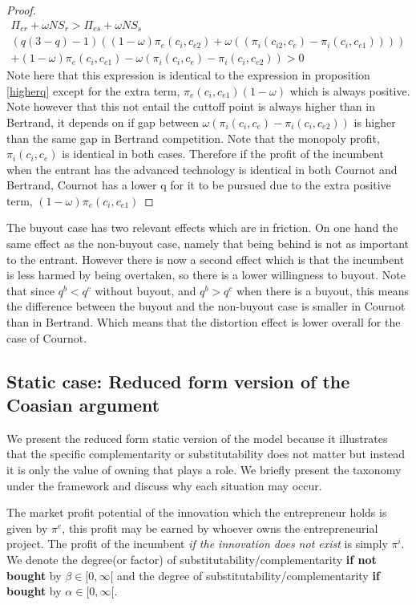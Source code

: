 \begin{proof}
\begin{align*}
\Pi_{er} + \omega NS_{r}
> \Pi_{es} + \omega NS_{s} \\
(q  (3-q)-1)((1-\omega)\pi_{e}(c_i,c_{e2})+\omega((\pi_{i}(c_{i2},c_{e})-\pi_{i}(c_i,c_{e1})))) \\
+(1-\omega)\pi_{e}(c_i,c_{e1})
-\omega(\pi_{i}(c_i,c_{e}) 
-\pi_{i}(c_{i},c_{e2}))>0
\end{align*} 
Note here that this expression is identical to the expression in proposition \ref{higherq} except for the extra term, $\pi_{e}(c_i,c_{e1})(1-\omega)$ which is always positive. Note however that this not entail the cuttoff point is always higher than in Bertrand, it depends on if gap between $\omega(\pi_{i}(c_i,c_{e}) 
-\pi_{i}(c_{i},c_{e2}))$ is higher than the same gap in Bertrand competition. Note that the monopoly profit,$\pi_{i}(c_i,c_{e})$ is identical in both cases. Therefore if the profit of the incumbent when the entrant has the advanced technology is identical in both Cournot and Bertrand, Cournot has a lower q for it to be pursued due to the extra positive term, $(1-\omega) \pi_e(c_i,c_{e1})$ 
\end{proof}

The buyout case has two relevant effects which are in friction. On one hand the same effect as the non-buyout case, namely that being behind is not as important to the entrant. However there is now a second effect which is that the incumbent is less harmed by being overtaken, so there is a lower willingness to buyout. Note that since $q^b<q^c$ without buyout, and $q^b>q^c$ when there is a buyout, this means the difference between the buyout and the non-buyout case is smaller in Cournot than in Bertrand. Which means that the distortion effect is lower overall for the case of Cournot. 
\subsection{Static case: Reduced form version of the Coasian argument}\label{static}

We present the reduced form static version of the model because it illustrates that the specific complementarity or substitutability does not matter but instead it is only the  value of owning that plays a role.  We briefly present the taxonomy under the framework and discuss why each situation may occur. 

The market profit potential of the innovation which the entrepreneur holds is given by $\pi^e$, this profit may be earned by whoever owns the entrepreneurial project. The profit of the incumbent \textit{if the innovation does not exist} is simply $\pi^i$. We denote the degree(or factor) of substitutability/complementarity \textbf{if not bought} by $\beta \in [ 0, \infty [$ and the degree of substitutability/complementarity  \textbf{if bought} by $\alpha \in [0, \infty [ $. 

